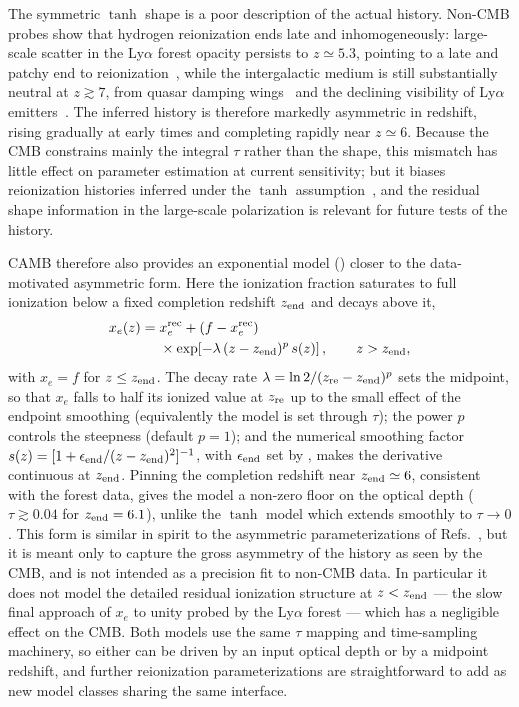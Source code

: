 \documentclass[prd, twocolumn, superscriptaddress, tightenlines, longbibliography, nofootinbib, eqsecnum, amsfonts, amsmath, floatfix, notitlepage]{revtex4-2}
\newcommand{\code}[1]{\texttt{\detokenize{#1}}}
\begin{document}
The symmetric $\tanh$ shape is a poor description of the actual history. Non-CMB
probes show that hydrogen reionization ends late and inhomogeneously: large-scale
scatter in the Ly$\alpha$ forest opacity persists to $z\simeq5.3$, pointing to a
late and patchy end to reionization~\cite{Bosman:2021obf,Fan:2006dp}, while the
intergalactic medium is still substantially neutral at $z\gtrsim7$, from quasar
damping wings~\cite{Davies:2018yfp} and the declining visibility of Ly$\alpha$
emitters~\cite{Mason:2017eqr}. The inferred history is therefore markedly
asymmetric in redshift, rising gradually at early times and completing rapidly
near $z\simeq6$. Because the CMB constrains mainly the integral $\tau$ rather than
the shape, this mismatch has little effect on parameter estimation at current
sensitivity; but it biases reionization histories inferred under the $\tanh$
assumption~\cite{Qin:2020xrg,Planck:2016mks}, and the residual shape information in
the large-scale polarization is relevant for future tests of the history.

\textsc{CAMB} therefore also provides an exponential model
(\code{ExpReionization}) closer to the data-motivated asymmetric form. Here the
ionization fraction saturates to full ionization below a fixed completion
redshift $z_{\rm end}$ and decays above it,
\begin{equation}
  \label{eq:reion-exp}
  \begin{aligned}
  x_e(z)={}&x_e^{\rm rec} + (f - x_e^{\rm rec})\\
  &{}\times\exp\!\left[-\lambda\,(z-z_{\rm end})^{p}\,s(z)\right],
  \qquad z > z_{\rm end},
  \end{aligned}
\end{equation}
with $x_e=f$ for $z\le z_{\rm end}$. The decay rate
$\lambda=\ln 2/(z_{\rm re}-z_{\rm end})^{p}$ sets the midpoint, so that $x_e$ falls
to half its ionized value at $z_{\rm re}$ up to the small effect of the endpoint
smoothing (equivalently the model is set through $\tau$); the power $p$ controls
the steepness (default $p=1$); and the numerical smoothing factor
$s(z)=[1+\epsilon_{\rm end}/(z-z_{\rm end})^2]^{-1}$, with
$\epsilon_{\rm end}$ set by \code{reion_exp_smooth_width}, makes the derivative
continuous at $z_{\rm end}$. Pinning the completion redshift near
$z_{\rm end}\simeq6$, consistent with the forest data, gives the model a non-zero
floor on the optical depth ($\tau\gtrsim0.04$ for $z_{\rm end}=6.1$), unlike the
$\tanh$ model which extends smoothly to $\tau\to0$. This form is similar in spirit
to the asymmetric parameterizations of Refs.~\cite{Douspis:2015nca,Qin:2020xrg},
but it is meant only to capture the gross asymmetry of the history as seen by the
CMB, and is not intended as a precision fit to non-CMB data. In particular it does
not model the detailed residual ionization structure at $z<z_{\rm end}$ --- the
slow final approach of $x_e$ to unity probed by the Ly$\alpha$ forest --- which
has a negligible effect on the CMB. Both models use the same $\tau$ mapping and
time-sampling machinery, so either can be driven by an input optical depth or by a
midpoint redshift, and further reionization parameterizations are
straightforward to add as new model classes sharing the same interface.
\end{document}
